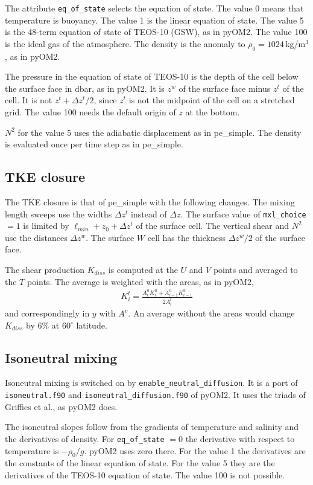 \documentclass[12pt]{article}
\newcommand{\beq}  { \begin{eqnarray} }
\newcommand{\eeq}  { \end{eqnarray}}
\begin{document}
The attribute \verb|eq_of_state| selects the equation of state.
The value 0 means that temperature is buoyancy.
The value 1 is the linear equation of state.
The value 5 is the 48-term equation of state of TEOS-10 (GSW), as in pyOM2.
The value 100 is the ideal gas of the atmosphere.
The density is the anomaly to $\rho_0 = 1024\,$kg/m$^3$, as in pyOM2.

The pressure in the equation of state of TEOS-10 is the depth of the cell below the surface face in dbar, as in pyOM2.
It is $z^w$ of the surface face minus $z^t$ of the cell.
It is not $z^t + \Delta z^t/2$, since $z^t$ is not the midpoint of the cell on a stretched grid.
The value 100 needs the default origin of $z$ at the bottom.

$N^2$ for the value 5 uses the adiabatic displacement as in pe\_simple.
The density is evaluated once per time step as in pe\_simple.

\subsection*{TKE closure}

The TKE closure is that of pe\_simple with the following changes.
The mixing length sweeps use the widths $\Delta z^t$ instead of $\Delta z$.
The surface value of \verb|mxl_choice| $=1$ is limited by $\ell_{min} + z_0 + \Delta z^t$ of the surface cell.
The vertical shear and $N^2$ use the distances $\Delta z^w$.
The surface $W$ cell has the thickness $\Delta z^w/2$ of the surface face.

The shear production $K_{diss}$ is computed at the $U$ and $V$ points and averaged to the $T$ points.
The average is weighted with the areas, as in pyOM2,
\beq
 K^t_i = \frac{A^u_i K^u_i + A^u_{i-1} K^u_{i-1}}{2 A^t_i}
\eeq
and correspondingly in $y$ with $A^v$.
An average without the areas would change $K_{diss}$ by 6\% at $60^\circ$ latitude.

\subsection*{Isoneutral mixing}

Isoneutral mixing is switched on by \verb|enable_neutral_diffusion|.
It is a port of \verb|isoneutral.f90| and \verb|isoneutral_diffusion.f90| of pyOM2.
It uses the triads of Griffies et al., as pyOM2 does.

The isoneutral slopes follow from the gradients of temperature and salinity and the derivatives of density.
For \verb|eq_of_state| $=0$ the derivative with respect to temperature is $-\rho_0/g$.
pyOM2 uses zero there.
For the value 1 the derivatives are the constants of the linear equation of state.
For the value 5 they are the derivatives of the TEOS-10 equation of state.
The value 100 is not possible.
\end{document}
